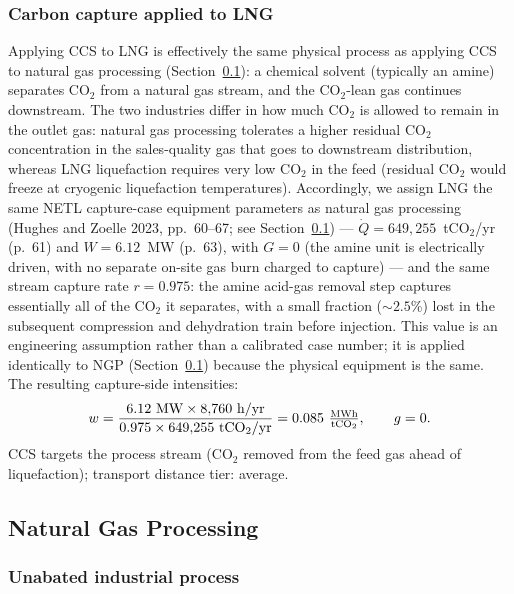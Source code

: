 \documentclass[11pt]{article}
\newcommand{\cotwo}{\ensuremath{\mathrm{CO_2}}}
\begin{document}
\subsubsection{Carbon capture applied to LNG}

Applying CCS to LNG is effectively the same physical process as applying CCS to natural gas processing (Section~\ref{sec:const_ngp}): a chemical solvent (typically an amine) separates \cotwo{} from a natural gas stream, and the \cotwo{}-lean gas continues downstream. The two industries differ in how much \cotwo{} is allowed to remain in the outlet gas: natural gas processing tolerates a higher residual \cotwo{} concentration in the sales-quality gas that goes to downstream distribution, whereas LNG liquefaction requires very low \cotwo{} in the feed (residual \cotwo{} would freeze at cryogenic liquefaction temperatures). Accordingly, we assign LNG the same NETL capture-case equipment parameters as natural gas processing (Hughes and Zoelle 2023, pp.~60--67; see Section~\ref{sec:const_ngp}) --- $\dot{Q} = 649{,}255$~t\cotwo{}/yr (p.~61) and $W = 6.12$~MW (p.~63), with $G = 0$ (the amine unit is electrically driven, with no separate on-site gas burn charged to capture) --- and the same stream capture rate $r = 0.975$: the amine acid-gas removal step captures essentially all of the \cotwo{} it separates, with a small fraction ($\sim 2.5\%$) lost in the subsequent compression and dehydration train before injection. This value is an engineering assumption rather than a calibrated case number; it is applied identically to NGP (Section~\ref{sec:const_ngp}) because the physical equipment is the same. The resulting capture-side intensities:
%
\[
  w = \frac{6.12~\text{MW} \times 8{,}760~\text{h/yr}}{0.975 \times 649{,}255~\text{t\cotwo{}/yr}} = 0.085~\tfrac{\text{MWh}}{\text{t\cotwo{}}}, \qquad g = 0.
\]
%
CCS targets the process stream (\cotwo{} removed from the feed gas ahead of liquefaction); transport distance tier: average.

\subsection{Natural Gas Processing}
\label{sec:const_ngp}

\subsubsection{Unabated industrial process}
\end{document}
